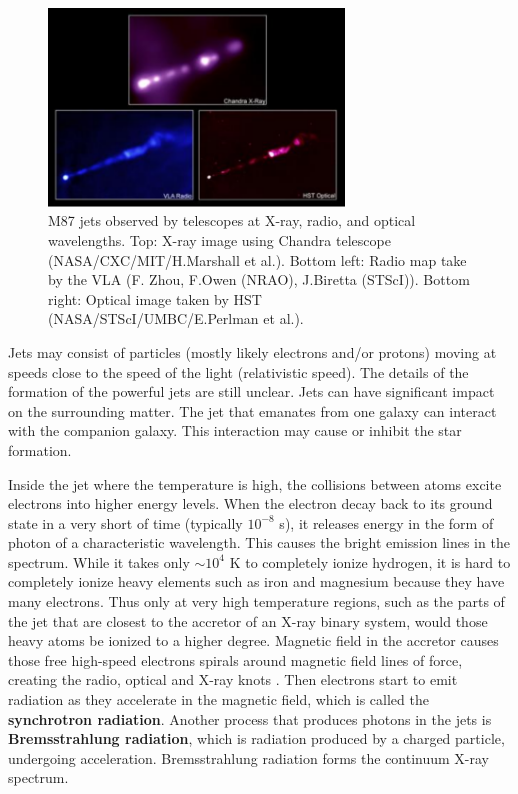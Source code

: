 \begin{figure}[ht]
    \centering
    \includegraphics[width = 0.7\textwidth]{Chapters/Figures/M87jet.png}
    \caption{M87 jets observed by telescopes at X-ray, radio, and optical wavelengths. Top: X-ray image using Chandra telescope (NASA/CXC/MIT/H.Marshall et al.). Bottom left: Radio map take by the VLA (F. Zhou, F.Owen (NRAO), J.Biretta (STScI)). Bottom right: Optical image taken by HST (NASA/STScI/UMBC/E.Perlman et al.).  }
    \label{m87}
\end{figure}

Jets may consist of particles (mostly likely electrons and/or protons) moving at speeds close to the speed of the light (relativistic speed). The details of the formation of the powerful jets are still unclear. Jets can have significant impact on the surrounding matter. The jet that emanates from one galaxy can interact with the companion galaxy. This interaction may cause or inhibit the star formation.\par 

Inside the jet where the temperature is high, the collisions between atoms excite electrons into higher energy levels. When the electron decay back to its ground state in a very short of time (typically $10^{-8}$ s), it releases energy in the form of photon of a characteristic wavelength. This causes the bright emission lines in the spectrum. While it takes only $\sim 10^4$ K to completely ionize hydrogen, it is hard to completely ionize heavy elements such as iron and magnesium because they have many electrons. Thus only at very high temperature regions, such as the parts of the jet that are closest to the accretor of an X-ray binary system, would those heavy atoms be ionized to a higher degree. Magnetic field in the accretor causes those free high-speed electrons spirals around magnetic field lines of force, creating the radio, optical and X-ray knots \citep{Miller_2002}. Then electrons start to emit radiation as they accelerate in the magnetic field, which is called the \textbf{synchrotron radiation}. Another process that produces photons in the jets is  \textbf{Bremsstrahlung radiation}, which is radiation produced by a charged particle, undergoing acceleration. Bremsstrahlung radiation forms the continuum X-ray spectrum.



